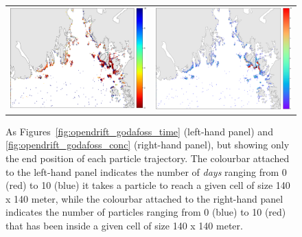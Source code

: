 \begin{figure}[htb]
  \begin{center}
    \begin{tabular}{cc}
      \includegraphics*[width=7.2cm]{Figurer/opendrift/opendrift_godafoss_shortest_time_zoom_endpos_crop}  & \includegraphics*[width=7.2cm]{Figurer/opendrift/opendrift_godafoss_consentration_zoom_endpos_crop}\\ 
    \end{tabular}
    \caption{\small As Figures~\ref{fig:opendrift_godafoss_time} (left-hand panel) and \ref{fig:opendrift_godafoss_conc} (right-hand panel), but showing only the end position of each particle trajectory. The colourbar attached to the left-hand panel indicates the number of \emph{days} ranging from 0 (red) to 10 (blue) it takes a particle to reach a given cell of size 140 x 140 meter, while the colourbar attached to the right-hand panel indicates the number of particles ranging from 0 (blue) to 10 (red) that has been inside a given cell of size 140 x 140 meter.}
    \label{fig:opendrift_godafoss_endpos}
  \end{center}
\end{figure}

